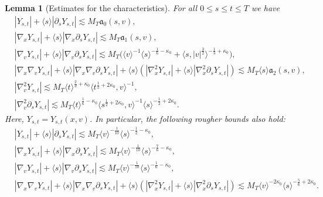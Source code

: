 \documentclass[reqno,11pt]{amsart}
\numberwithin{equation}{section}
\newtheorem{lemma}[theorem]{Lemma}
\begin{document}
	\begin{lemma} [Estimates for the characteristics]\label{keyle}  
	For all $0\le s\le t\le T$ we have
	\begin{align}\label{n13}
		&	|Y_{s,t}|+\langle s\rangle	|\partial_sY_{s,t}|\lesssim   M_T\mathfrak{a}_0(s,v),\\
		&\label{n14}	|\nabla_xY_{s,t}|+\langle s\rangle	|\nabla_x\partial_sY_{s,t}|\lesssim  M_T\mathfrak{a}_1(s,v),\\
		&\label{xf}|\nabla_vY_{s,t}|+\langle s\rangle	|\nabla_v\partial_sY_{s,t}|\lesssim  M_T\big(\langle v\rangle^{-1}\langle s\rangle^{-\frac{1}{6}-\kappa_0}+\langle s,|v|^{\frac{3}{2}}\rangle^{-\frac{1}{3}+\kappa_0}\big),\\
		&\label{n15}	|\nabla_x\nabla_vY_{s,t}|+\langle s\rangle 	|\nabla_x\nabla_v\partial_sY_{s,t}|+\langle s\rangle(	|\nabla_x^2Y_{s,t}|+\langle s\rangle	|\nabla_x^2\partial_sY_{s,t}|)\lesssim  M_T\langle s\rangle\mathfrak{a}_2(s,v),\\
		&\label{n17}|\nabla_v^2Y_{s,t}|\lesssim M_T	\langle t\rangle^{\frac{2}{3}+\kappa_0}	\langle t^{\frac{1}{2}+2\kappa_0},v\rangle^{-1}
		,\\&\label{n17b}
		|\nabla_v^2\partial_sY_{s,t}|\lesssim	M_T\langle t\rangle^{\frac{1}{6}-\kappa_0}	\langle s^{\frac12+2\kappa_0},v\rangle^{-1}
		\langle s\rangle^{-\frac12+2\kappa_0}.
	\end{align}
	Here, $Y_{s,t}=Y_{s,t}(x,v)$. In particular, the following
	rougher bounds also hold:
	\begin{align}\label{n13'}
		&	|Y_{s,t}|+\langle s\rangle	|\partial_sY_{s,t}|\lesssim   M_T
		\langle v\rangle^{-\frac{1}{10}}\langle s\rangle^{-\frac12-\kappa_0}	,\\&\label{n14'}	|\nabla_xY_{s,t}|+\langle s\rangle	|\nabla_x\partial_sY_{s,t}|\lesssim  M_T\langle v\rangle^{-\frac{1}{10}}\langle s\rangle^{-\frac{7}{6}-\kappa_0}
		,\\&\label{xf'}
		|\nabla_vY_{s,t}|+\langle s\rangle	|\nabla_v\partial_sY_{s,t}|\lesssim  M_T\langle v\rangle^{-\frac{1}{10}}\langle s\rangle^{-\frac{1}{6}-\kappa_0},\\
		&\label{n15'}	|\nabla_x\nabla_vY_{s,t}|+\langle s\rangle 	|\nabla_x\nabla_v\partial_sY_{s,t}|+\langle s\rangle(	|\nabla_x^2Y_{s,t}|+\langle s\rangle	|\nabla_x^2\partial_sY_{s,t}|)\lesssim  M_T\langle v\rangle^{-2\kappa_0}  \langle s\rangle^{-\frac{5}{6}+2\kappa_0}.
	\end{align}
\end{lemma}
\end{document}
